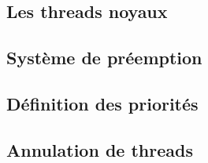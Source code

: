 \subsection{Les threads noyaux}


\subsection{Système de préemption}


\subsection{Définition des priorités}


\subsection{Annulation de threads}


